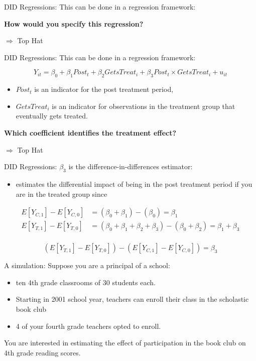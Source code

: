 \documentclass[
  ignorenonframetext,
]{beamer}
\providecommand{\tightlist}{%
  \setlength{\itemsep}{0pt}\setlength{\parskip}{0pt}}
\begin{document}
\begin{frame}{DID Regressions:}
\protect\hypertarget{did-regressions}{}
This can be done in a regression framework:

\textbf{How would you specify this regression?}

\(\Rightarrow\) Top Hat
\end{frame}

\begin{frame}{DID Regressions:}
\protect\hypertarget{did-regressions-1}{}
This can be done in a regression framework:

\[
Y_{it}=\beta_0+\beta_1 Post_t+\beta_2 GetsTreat_i+\beta_3 Post_t\times GetsTreat_i+u_{it}
\]

\begin{itemize}
\item
  \(Post_t\) is an indicator for the post treatment period,
\item
  \(GetsTreat_i\) is an indicator for observations in the treatment
  group that eventually gets treated.
\end{itemize}

\textbf{Which coefficient identifies the treatment effect?}

\(\Rightarrow\) Top Hat
\end{frame}

\begin{frame}{DID Regressions:}
\protect\hypertarget{did-regressions-2}{}
\(\beta_3\) is the difference-in-differences estimator:

\begin{itemize}
\tightlist
\item
  estimates the differential impact of being in the post treatment
  period if you are in the treated group since
\end{itemize}

\small

\[
\begin{aligned}
E[Y_{C,1}]-E[Y_{C,0}]&=(\beta_0+\beta_1)-(\beta_0)=\beta_1\\
E[Y_{T,1}]-E[Y_{T,0}]&=(\beta_0+\beta_1+\beta_2+\beta_3)-(\beta_0+\beta_2)=\beta_1+\beta_3\\
\end{aligned}
\]

\[
(E[Y_{T,1}]-E[Y_{T,0}])-(E[Y_{C,1}]-E[Y_{C,0}])=\beta_3
\]
\end{frame}

\begin{frame}{A simulation:}
\protect\hypertarget{a-simulation}{}
Suppose you are a principal of a school:

\begin{itemize}
\item
  ten 4th grade classrooms of 30 students each.
\item
  Starting in 2001 school year, teachers can enroll their class in the
  scholastic book club
\item
  4 of your fourth grade teachers opted to enroll.
\end{itemize}

You are interested in estimating the effect of participation in the book
club on 4th grade reading scores.
\end{frame}
\end{document}
